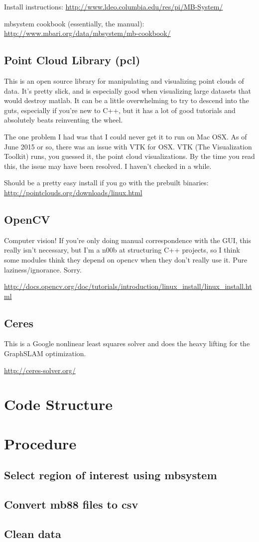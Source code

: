 \documentclass[12pt]{amsart}
\begin{document}
Install instructions: \url{http://www.ldeo.columbia.edu/res/pi/MB-System/}

mbsystem cookbook (essentially, the manual): \url{http://www.mbari.org/data/mbsystem/mb-cookbook/}

\subsection*{Point Cloud Library (pcl)}
This is an open source library for manipulating and visualizing point clouds of data. It's pretty slick, and is especially good when visualizing large datasets that would destroy matlab. It can be a little overwhelming to try to descend into the guts, especially if you're new to C++, but it has a lot of good tutorials and absolutely beats reinventing the wheel.

The one problem I had was that I could never get it to run on Mac OSX. As of June 2015 or so, there was an issue with VTK for OSX. VTK (The Visualization Toolkit) runs, you guessed it, the point cloud visualizations. By the time you read this, the issue may have been resolved. I haven't checked in a while.

Should be a pretty easy install if you go with the prebuilt binaries: 
\url{http://pointclouds.org/downloads/linux.html}

\subsection*{OpenCV}
Computer vision! If you're only doing manual correspondence with the GUI, this really isn't necessary, but I'm a n00b at structuring C++ projects, so I think some modules think they depend on opencv when they don't really use it. Pure laziness/ignorance. Sorry.

\url{http://docs.opencv.org/doc/tutorials/introduction/linux_install/linux_install.html}

\subsection*{Ceres}
This is a Google nonlinear least squares solver and does the heavy lifting for the GraphSLAM optimization.

\url{http://ceres-solver.org/}

\section{Code Structure}

\section{Procedure}
\subsection{Select region of interest using mbsystem}
\subsection{Convert mb88 files to csv}
\subsection{Clean data }
\end{document}
